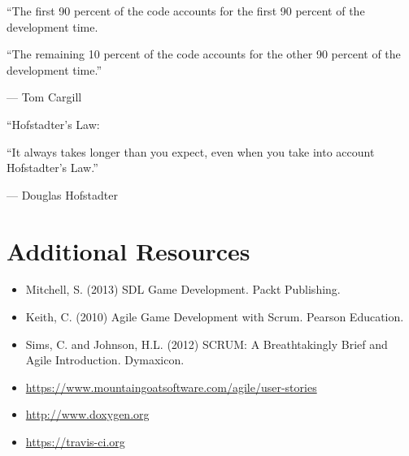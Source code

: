 \documentclass{../fal_assignment}
\begin{document}
\begin{marginquote}
    ``The first 90 percent of the code accounts for the first 90 percent of the development time.
    
    ``The remaining 10 percent of the code accounts for the other 90 percent of the development time.''
    
    --- Tom Cargill
    
    \marginquoterule
    
    ``Hofstadter's Law:
    
    ``It always takes longer than you expect, even when you take into account Hofstadter's Law.''
    
    --- Douglas Hofstadter
\end{marginquote}
\section*{Additional Resources}

\begin{itemize}
    \item Mitchell, S. (2013) SDL Game Development. Packt Publishing.
    \item Keith, C. (2010) Agile Game Development with Scrum. Pearson Education.
    \item Sims, C. and Johnson, H.L. (2012) SCRUM: A Breathtakingly Brief and Agile Introduction. Dymaxicon.
    \item \url{https://www.mountaingoatsoftware.com/agile/user-stories}
    \item \url{http://www.doxygen.org}
    \item \url{https://travis-ci.org}
\end{itemize}
\end{document}
